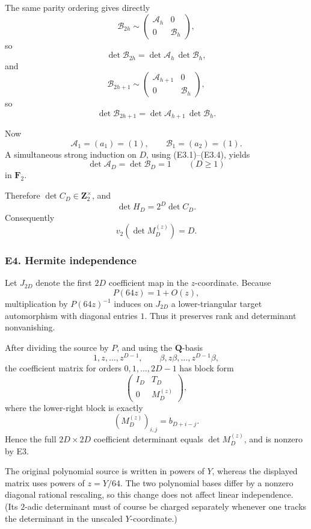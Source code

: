 \documentclass[
  10pt,
  letterpaper,
]{article}
\theoremstyle{definition}
\theoremstyle{remark}
\begin{document}
The same parity ordering gives directly \[
\mathcal B_{2h}\sim
\begin{pmatrix}
\mathcal A_h&0\\
0&\mathcal B_h
\end{pmatrix},
\] so \[
\det\mathcal B_{2h}
=\det\mathcal A_h\,\det\mathcal B_h,
\tag{E3.3}
\] and \[
\mathcal B_{2h+1}\sim
\begin{pmatrix}
\mathcal A_{h+1}&0\\
0&\mathcal B_h
\end{pmatrix},
\] so \[
\det\mathcal B_{2h+1}
=\det\mathcal A_{h+1}\,\det\mathcal B_h.
\tag{E3.4}
\]

Now \[
\mathcal A_1=(a_1)=(1),
\qquad
\mathcal B_1=(a_2)=(1).
\] A simultaneous strong induction on \(D\), using (E3.1)--(E3.4),
yields \[
\det\mathcal A_D=
\det\mathcal B_D=1
\qquad(D\ge1)
\] in \(\mathbf F_2\).

Therefore \(\det C_D\in\mathbf Z_2^\times\), and \[
\det H_D=2^D\det C_D.
\] Consequently \[
\boxed{v_2(\det M_D^{(z)})=D.}
\]

\subsubsection{E4. Hermite independence}\label{e4.-hermite-independence}

Let \(J_{2D}\) denote the first \(2D\) coefficient map in the
\(z\)-coordinate. Because \[
P(64z)=1+O(z),
\] multiplication by \(P(64z)^{-1}\) induces on \(J_{2D}\) a
lower-triangular target automorphism with diagonal entries \(1\). Thus
it preserves rank and determinant nonvanishing.

After dividing the source by \(P\), and using the \(\mathbf Q\)-basis \[
1,z,\ldots,z^{D-1},
\qquad
\beta,z\beta,\ldots,z^{D-1}\beta,
\] the coefficient matrix for orders \(0,1,\ldots,2D-1\) has block form
\[
\begin{pmatrix}
I_D&T_D\\
0&M_D^{(z)}
\end{pmatrix},
\] where the lower-right block is exactly \[
(M_D^{(z)})_{i,j}=b_{D+i-j}.
\] Hence the full \(2D\times2D\) coefficient determinant equals
\(\det M_D^{(z)}\), and is nonzero by E3.

The original polynomial source is written in powers of \(Y\), whereas
the displayed matrix uses powers of \(z=Y/64\). The two polynomial bases
differ by a nonzero diagonal rational rescaling, so this change does not
affect linear independence. (Its \(2\)-adic determinant must of course
be charged separately whenever one tracks the determinant in the
unscaled \(Y\)-coordinate.)
\end{document}
